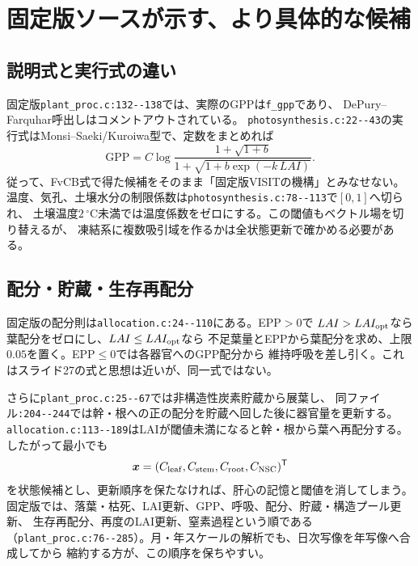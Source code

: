 \documentclass[a4paper,11pt]{ltjsarticle}
\newcommand{\code}[1]{\nolinkurl{#1}}
\begin{document}
\section{固定版ソースが示す、より具体的な候補}
\subsection{説明式と実行式の違い}
固定版\code{plant_proc.c:132--138}では、実際のGPPは\code{f_gpp}であり、
DePury--Farquhar呼出しはコメントアウトされている。
\code{photosynthesis.c:22--43}の実行式はMonsi--Saeki/Kuroiwa型で、定数をまとめれば
\begin{equation}
 \mathrm{GPP}=C\log\frac{1+\sqrt{1+b}}
 {1+\sqrt{1+b\exp(-k\,LAI)}}.
\end{equation}
従って、FvCB式で得た候補をそのまま「固定版VISITの機構」とみなせない。
温度、気孔、土壌水分の制限係数は\code{photosynthesis.c:78--113}で$[0,1]$へ切られ、
土壌温度$2\,^{\circ}\mathrm C$未満では温度係数をゼロにする。この閾値もベクトル場を切り替えるが、
凍結系に複数吸引域を作るかは全状態更新で確かめる必要がある。

\subsection{配分・貯蔵・生存再配分}
固定版の配分則は\code{allocation.c:24--110}にある。EPP$>0$で
$LAI>LAI_{\rm opt}$なら葉配分をゼロにし、$LAI\le LAI_{\rm opt}$なら
不足葉量とEPPから葉配分を求め、上限$0.05$を置く。EPP$\le0$では各器官へのGPP配分から
維持呼吸を差し引く。これはスライド27の式と思想は近いが、同一式ではない。

さらに\code{plant_proc.c:25--67}では非構造性炭素貯蔵から展葉し、
同ファイル\code{:204--244}では幹・根への正の配分を貯蔵へ回した後に器官量を更新する。
\code{allocation.c:113--189}はLAIが閾値未満になると幹・根から葉へ再配分する。
したがって最小でも
\begin{equation}
 \bm x=(C_{\rm leaf},C_{\rm stem},C_{\rm root},C_{\rm NSC})^\mathsf T
\end{equation}
を状態候補とし、更新順序を保たなければ、肝心の記憶と閾値を消してしまう。
固定版では、落葉・枯死、LAI更新、GPP、呼吸、配分、貯蔵・構造プール更新、
生存再配分、再度のLAI更新、窒素過程という順である
（\code{plant_proc.c:76--285}）。月・年スケールの解析でも、日次写像を年写像へ合成してから
縮約する方が、この順序を保ちやすい。
\end{document}
